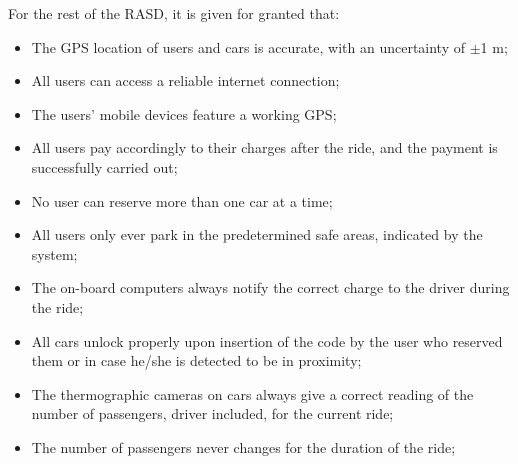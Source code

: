 For the rest of the RASD, it is given for granted that:

\begin{itemize}
\item The GPS location of users and cars is accurate, with an uncertainty of $\pm$1 m; 
\item All users can access a reliable internet connection;
\item The users' mobile devices feature a working GPS;
\item All users pay accordingly to their charges after the ride, and the payment is successfully carried out;
\item No user can reserve more than one car at a time;
\item All users only ever park in the predetermined safe areas, indicated by the system;
\item The on-board computers always notify the correct charge to the driver during the ride;
\item All cars unlock properly upon insertion of the code by the user who reserved them or in case he/she is detected to be in proximity;
\item The thermographic cameras on cars always give a correct reading of the number of passengers, driver included, for the current ride;
\item The number of passengers never changes for the duration of the ride;
\end{itemize}
